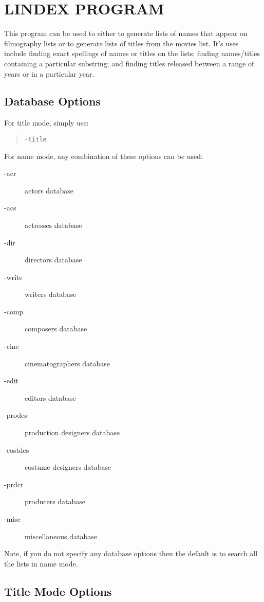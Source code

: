 \clearpage
\section{\label{lindex}LINDEX PROGRAM}

This program can be used to either to generate lists of names that appear 
on filmography lists or to generate lists of titles from the movies list.
It's uses include finding exact spellings of names or titles on the lists; 
finding names/titles containing a particular substring; and finding titles
released between a range of years or in a particular year.

\subsection{Database Options}

For title mode, simply use:
\begin{quote}
{\tt -title}
\end{quote}

For name mode, any combination of these options can be used:
\begin{description}
\item[-acr]    actors database
\item[-acs]    actresses database
\item[-dir]    directors database
\item[-write]  writers database
\item[-comp]   composers database
\item[-cine]   cinematographers database
\item[-edit]   editors database
\item[-prodes] production designers database
\item[-costdes] costume designers database
\item[-prdcr]  producers database
\item[-misc]  miscellaneous database
\end{description}

Note, if you do not specify any database options then the default is to 
search all the lists in name mode.

\subsection{Title Mode Options}

